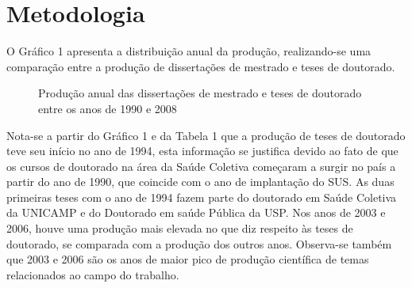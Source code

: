 \chapter{Metodologia}
\label{chap:metodologia}

%
%

O Gráfico 1 apresenta a distribuição anual da produção, realizando-se uma comparação entre a produção de dissertações de mestrado e teses de doutorado.

\begin{figure}[h!]
	\centering
	\caption{Produção anual das dissertações de mestrado e teses de doutorado entre os anos de 1990 e 2008}
	\label{fig_mapa}
\end{figure}

Nota-se a partir do Gráfico 1 e da Tabela 1 que a produção de teses de doutorado teve seu início no ano de 1994, esta informação se justifica devido ao fato de que os cursos de doutorado na área da Saúde Coletiva começaram a surgir no país a partir do ano de 1990, que coincide com o ano de implantação do SUS. As duas primeiras teses com o ano de 1994 fazem parte do doutorado em Saúde Coletiva da UNICAMP e do Doutorado em saúde Pública da USP. Nos anos de 2003 e 2006, houve uma produção mais elevada no que diz respeito às teses de doutorado, se comparada com a produção dos outros anos. Observa-se também que 2003 e 2006 são os anos de maior pico de produção científica de temas relacionados ao campo do trabalho.